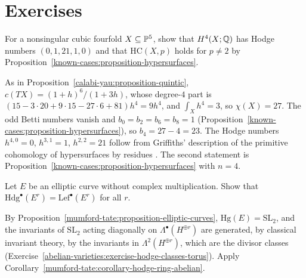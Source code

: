 \section{Exercises}\label{known-cases:section-exercises}

\begin{exercise}\label{known-cases:exercise-cubic-fourfold-numbers}
For a nonsingular cubic fourfold $X \subseteq \mathbb{P}^5$, show that $H^4(X; \mathbb{Q})$ has Hodge numbers $(0, 1, 21, 1, 0)$ and that $\mathrm{HC}(X, p)$ holds for $p \neq 2$ by
Proposition~\ref{known-cases:proposition-hypersurfaces}.
\end{exercise}

\begin{solution}
As in Proposition~\ref{calabi-yau:proposition-quintic}, $c(TX) = (1 + h)^6/(1 + 3h)$, whose degree-$4$ part is $(15 - 3 \cdot 20 + 9 \cdot 15 - 27 \cdot 6 + 81)h^4 = 9h^4$, and
$\int_Xh^4 = 3$, so $\chi(X) = 27$. The odd Betti numbers vanish and $b_0 = b_2 = b_6 = b_8 = 1$ (Proposition~\ref{known-cases:proposition-hypersurfaces}), so $b_4 = 27 - 4 = 23$. The Hodge
numbers $h^{4,0} = 0$, $h^{3,1} = 1$, $h^{2,2} = 21$ follow from Griffiths' description of the primitive cohomology of hypersurfaces by residues \cite{voisin-hodge-2}. The second statement is
Proposition~\ref{known-cases:proposition-hypersurfaces} with $n = 4$.
\end{solution}

\begin{exercise}\label{known-cases:exercise-lefschetz-ring-product}
Let $E$ be an elliptic curve without complex multiplication. Show that $\mathrm{Hdg}^\bullet(E^r) = \mathrm{Lef}^\bullet(E^r)$ for all $r$.
\end{exercise}

\begin{solution}
By Proposition~\ref{mumford-tate:proposition-elliptic-curves}, $\mathrm{Hg}(E) = \mathrm{SL}_2$, and the invariants of $\mathrm{SL}_2$ acting diagonally on $\Lambda^\bullet(H^{\oplus r})$ are generated, by classical
invariant theory, by the invariants in $\Lambda^2(H^{\oplus r})$, which are the divisor classes (Exercise~\ref{abelian-varieties:exercise-hodge-classes-torus}). Apply
Corollary~\ref{mumford-tate:corollary-hodge-ring-abelian}.
\end{solution}
